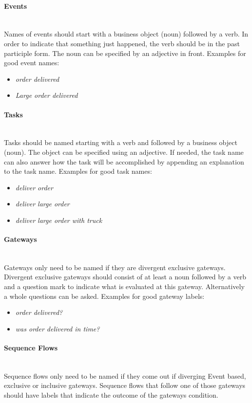 \paragraph{Events}~\\
Names of events should start with a business object (noun) followed by a verb. In order to indicate that something just happened, the verb should be in the past participle form. The noun can be specified by an adjective in front. Examples for good event names: 
\begin{itemize}
	\item \textit{order delivered}
	\item \textit{Large order delivered}
\end{itemize}

\paragraph{Tasks}~\\
Tasks should be named starting with a verb and followed by a business object (noun). The object can be specified using an adjective. If needed, the task name can also answer how the task will be accomplished by appending an explanation to the task name. Examples for good task names:
\begin{itemize}
	\item \textit{deliver order}
	\item \textit{deliver large order}
	\item \textit{deliver large order with truck}
\end{itemize}

\paragraph{Gateways}~\\
Gateways only need to be named if they are divergent exclusive gateways. Divergent exclusive gateways should consist of at least a noun followed by a verb and a question mark to indicate what is evaluated at this gateway. Alternatively a whole questions can be asked. Examples for good gateway labels:
\begin{itemize}
	\item \textit{order delivered?}
	\item \textit{was order delivered in time?}
\end{itemize}

\paragraph{Sequence Flows}~\\
Sequence flows only need to be named if they come out if diverging Event based, exclusive or inclusive gateways. Sequence flows that follow one of those gateways should have labels that indicate the outcome of the gateways condition. 

